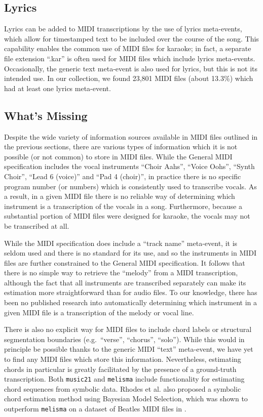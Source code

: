\documentclass{article}
\begin{document}
\subsection{Lyrics}

Lyrics can be added to MIDI transcriptions by the use of lyrics meta-events, which allow for timestamped text to be included over the course of the song.
This capability enables the common use of MIDI files for karaoke; in fact, a separate file extension ``.kar'' is often used for MIDI files which include lyrics meta-events.
Occasionally, the generic text meta-event is also used for lyrics, but this is not its intended use.
In our collection, we found 23,801 MIDI files (about 13.3\%) which had at least one lyrics meta-event.

\subsection{What's Missing}
\label{sec:missing}

Despite the wide variety of information sources available in MIDI files outlined in the previous sections, there are various types of information which it is not possible (or not common) to store in MIDI files.
While the General MIDI specification includes the vocal instruments ``Choir Aahs'', ``Voice Oohs'', ``Synth Choir'', ``Lead 6 (voice)'' and ``Pad 4 (choir)'', in practice there is no specific program number (or numbers) which is consistently used to transcribe vocals.
As a result, in a given MIDI file there is no reliable way of determining which instrument is a transcription of the vocals in a song.
Furthermore, because a substantial portion of MIDI files were designed for karaoke, the vocals may not be transcribed at all.

While the MIDI specification does include a ``track name'' meta-event, it is seldom used and there is no standard for its use, and so the instruments in MIDI files are further constrained to the General MIDI specification.
It follows that there is no simple way to retrieve the ``melody'' from a MIDI transcription, although the fact that all instruments are transcribed separately can make its estimation more straightforward than for audio files.
To our knowledge, there has been no published research into automatically determining which instrument in a given MIDI file is a transcription of the melody or vocal line.

There is also no explicit way for MIDI files to include chord labels or structural segmentation boundaries (e.g.\ ``verse'', ``chorus'', ``solo'').
While this would in principle be possible thanks to the generic MIDI ``text'' meta-event, we have yet to find any MIDI files which store this information.
Nevertheless, estimating chords in particular is greatly facilitated by the presence of a ground-truth transcription.
Both \texttt{music21} \cite{cuthbert2010music21} and \texttt{melisma} \cite{sleator2001melisma} include functionality for estimating chord sequences from symbolic data.
Rhodes et al.\cite{rhodes2007bayesian} also proposed a symbolic chord estimation method using Bayesian Model Selection, which was shown to outperform \texttt{melisma} on a dataset of Beatles MIDI files in \cite{ewert2012towards}.
\end{document}
